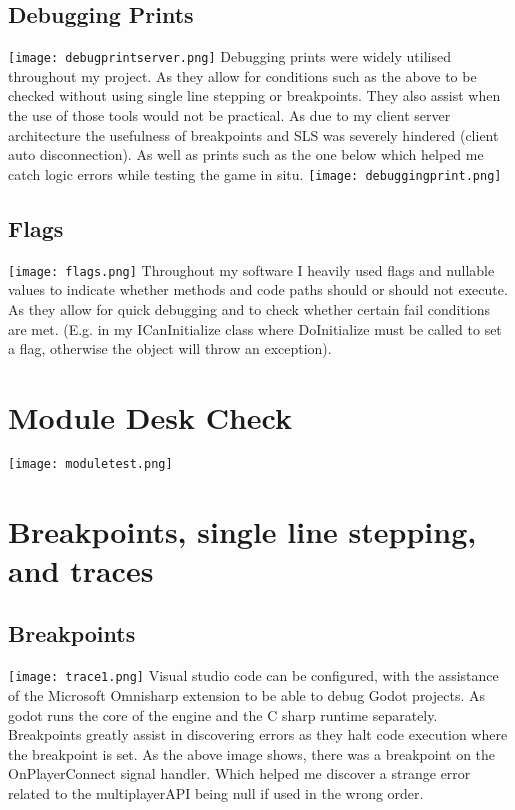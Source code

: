 \documentclass[12pt, DIV=calc]{scrartcl}
\begin{document}
\subsection{Debugging Prints}
\texttt{[image: debugprintserver.png]}
Debugging prints were widely utilised throughout my project. As they allow for conditions such as the above to be checked without using single line stepping or breakpoints. They also assist when the use of those tools would not be practical. As due to my client server architecture the usefulness of breakpoints and SLS was severely hindered (client auto disconnection). As well as prints such as the one below which helped me catch logic errors while testing the game in situ.
\texttt{[image: debuggingprint.png]}

\subsection{Flags}
\texttt{[image: flags.png]}
Throughout my software I heavily used flags and nullable values to indicate whether methods and code paths should or should not execute. As they allow for quick debugging and to check whether certain fail conditions are met. (E.g. in my ICanInitialize class where DoInitialize must be called to set a flag, otherwise the object will throw an exception).






\clearpage
\section{Module Desk Check}
\texttt{[image: moduletest.png]}



\clearpage
\section{Breakpoints, single line stepping, and traces}
\subsection{Breakpoints}
\texttt{[image: trace1.png]}
Visual studio code can be configured, with the assistance of the Microsoft Omnisharp extension to be able to debug Godot projects. As godot runs the core of the engine and the C sharp runtime separately. Breakpoints greatly assist in discovering errors as they halt code execution where the breakpoint is set. As the above image shows, there was a breakpoint on the OnPlayerConnect signal handler. Which helped me discover a strange error related to the multiplayerAPI being null if used in the wrong order.
\end{document}

